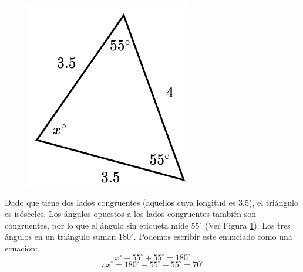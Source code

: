\begin{minipage}[t][][t]{0.6\textwidth}
    \begin{solutionbox}{8cm}
        \begin{minipage}{0.3\textwidth}
            \begin{figure}[H]
                \centering
                \includegraphics[width=0.9\linewidth]{../images/findangle05a.png}
                \caption{}
                \label{fig:findangle05a}
            \end{figure}
        \end{minipage}\hfill
        \begin{minipage}{0.65\textwidth}
            Dado que tiene dos lados congruentes (aquellos cuya longitud es 3.5), el triángulo es isósceles. Los ángulos opuestos a los lados congruentes también son congruentes, por lo que el ángulo sin etiqueta mide 55$^\circ$ (Ver Figura \ref{fig:findangle05a}).
            Los tres ángulos en un triángulo suman 180$^\circ$. Podemos escribir este enunciado como una ecuación:
            \[x^\circ + 55^\circ + 55^\circ = 180^\circ \]
            \[\therefore x^\circ = 180^\circ - 55^\circ - 55^\circ = 70^\circ\]
        \end{minipage}
    \end{solutionbox}
\end{minipage}